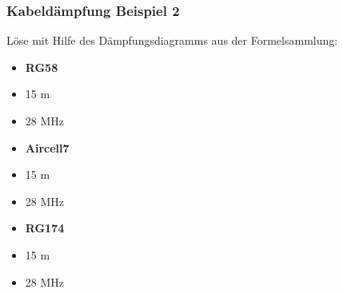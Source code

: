\begin{frame}
  \frametitle{Kabeldämpfung Beispiel 2}

  \begin{exampleblock}{Löse mit Hilfe des Dämpfungsdiagramms aus der Formelsammlung:}
    \begin{minipage}{0.3\textwidth}
      \begin{itemize}
        \item \textbf{RG58}\\
        \item 15 m\\
        \item 28 MHz
      \end{itemize}
    \end{minipage}
    \begin{minipage}{0.3\textwidth}
      \begin{itemize}
        \item \textbf{Aircell7}\\
        \item 15 m\\
        \item 28 MHz
      \end{itemize}
    \end{minipage}
    \begin{minipage}{0.3\textwidth}
      \begin{itemize}
        \item \textbf{RG174}\\
        \item 15 m\\
        \item 28 MHz
      \end{itemize}
    \end{minipage}
  \end{exampleblock}
\end{frame}

